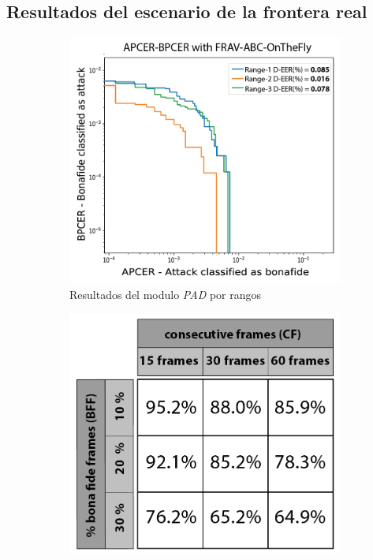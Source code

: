 \subsection{Resultados del escenario de la frontera real}%

\begin{figure}[t!]
    \centering
    \begin{subfigure}{.45\textwidth}
        \centering
        \includegraphics[width=1\linewidth]{ch-sistemasABC/images/ch-onthefly/APCER-BPCER-WITH-FRAV-ABC_b.png}
        \caption{Resultados del modulo \emph{PAD} por rangos}
        \label{fig:result_matrix_database}
    \end{subfigure}
    \begin{subfigure}{.45\textwidth}
        \centering
        \includegraphics[width=1\linewidth]{ch-sistemasABC/images/ch-onthefly/TRACKING-DEVICE.png}

\end{subfigure}
\end{figure}
